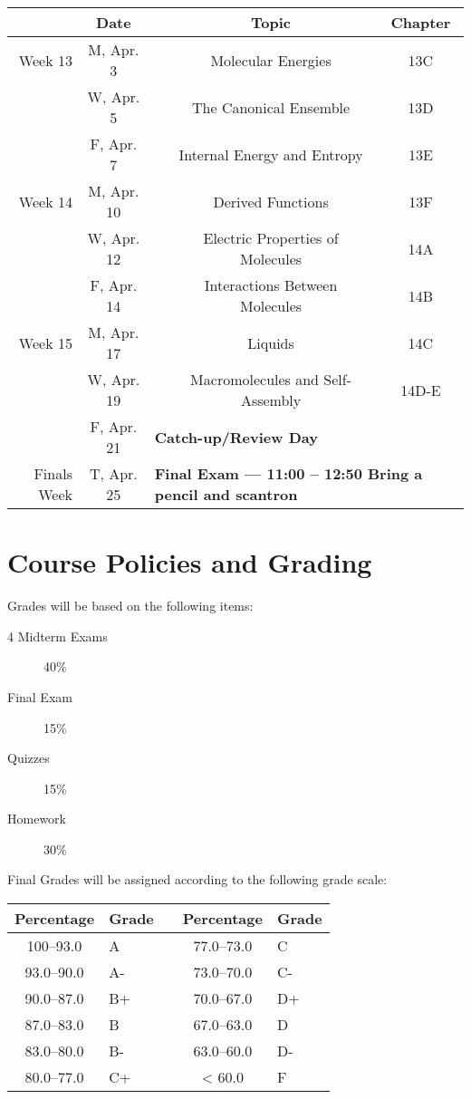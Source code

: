 \documentclass[12pt, letterpaper]{article}
\begin{document}
\begin{tabular}{rcccc}
& Date && Topic & Chapter\\
\midrule
Week 13 & M, Apr. 3&& Molecular Energies & 13C\\
& W, Apr. 5&& The Canonical Ensemble & 13D\\
& F, Apr. 7&& Internal Energy and Entropy & 13E\\
\midrule
Week 14 & M, Apr. 10&& Derived Functions & 13F\\
& W, Apr. 12&& Electric Properties of Molecules & 14A\\
& F, Apr. 14&& Interactions Between Molecules & 14B\\
\midrule
Week 15 & M, Apr. 17&& Liquids & 14C\\
& W, Apr. 19&& Macromolecules and Self-Assembly & 14D-E\\
& F, Apr. 21& \multicolumn{3}{l}{\textbf{Catch-up/Review Day}}\\
\midrule
Finals Week& T, Apr. 25& \multicolumn{3}{l}{\textbf{Final Exam --- 11:00 -- 12:50 Bring a pencil and scantron}}\\
\end{tabular}

\section*{Course Policies and Grading}
Grades will be based on the following items:
\begin{description}
	\item[4 Midterm Exams] 40\%
	\item[Final Exam] 15\%
	\item[Quizzes] 15\%
	\item[Homework] 30\%
\end{description}
Final Grades will be assigned according to the following grade scale:

\begin{tabular}{cl|c|cl}
	Percentage & Grade &  & Percentage & Grade \\ \midrule
	100--93.0  & A     &  & 77.0--73.0 & C     \\
	93.0--90.0 & A-    &  & 73.0--70.0 & C-    \\
	90.0--87.0 & B+    &  & 70.0--67.0 & D+    \\
	87.0--83.0 & B     &  & 67.0--63.0 & D     \\
	83.0--80.0 & B-    &  & 63.0--60.0 & D-    \\
	80.0--77.0 & C+    &  & < 60.0     & F
\end{tabular}
\end{document}

